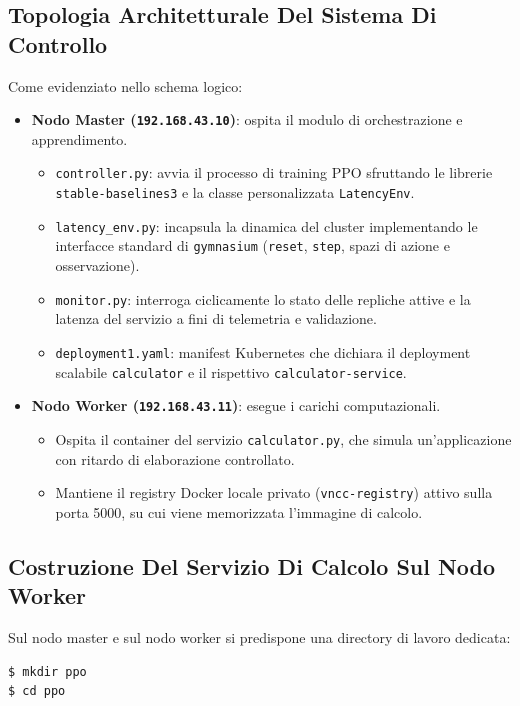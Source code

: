 \documentclass[11pt, a4paper]{article}
\begin{document}
\subsection{Topologia Architetturale Del Sistema Di Controllo}

Come evidenziato nello schema logico:
\begin{itemize}[noitemsep]
    \item \textbf{Nodo Master (\texttt{192.168.43.10})}: ospita il modulo di orchestrazione e apprendimento.
    \begin{itemize}[noitemsep]
        \item \texttt{controller.py}: avvia il processo di training PPO sfruttando le librerie \texttt{stable-baselines3} e la classe personalizzata \texttt{LatencyEnv}.
        \item \texttt{latency\_env.py}: incapsula la dinamica del cluster implementando le interfacce standard di \texttt{gymnasium} (\texttt{reset}, \texttt{step}, spazi di azione e osservazione).
        \item \texttt{monitor.py}: interroga ciclicamente lo stato delle repliche attive e la latenza del servizio a fini di telemetria e validazione.
        \item \texttt{deployment1.yaml}: manifest Kubernetes che dichiara il deployment scalabile \texttt{calculator} e il rispettivo \texttt{calculator-service}.
    \end{itemize}
    \item \textbf{Nodo Worker (\texttt{192.168.43.11})}: esegue i carichi computazionali.
    \begin{itemize}[noitemsep]
        \item Ospita il container del servizio \texttt{calculator.py}, che simula un'applicazione con ritardo di elaborazione controllato.
        \item Mantiene il registry Docker locale privato (\texttt{vncc-registry}) attivo sulla porta 5000, su cui viene memorizzata l'immagine di calcolo.
    \end{itemize}
\end{itemize}

\subsection{Costruzione Del Servizio Di Calcolo Sul Nodo Worker}

Sul nodo master e sul nodo worker si predispone una directory di lavoro dedicata:
\begin{lstlisting}[language=bash]
$ mkdir ppo
$ cd ppo
\end{lstlisting}
\end{document}
